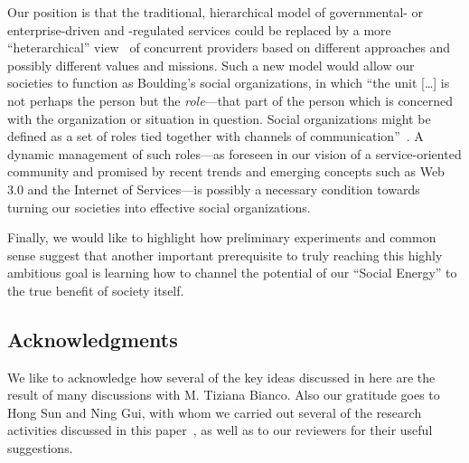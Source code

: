 \documentclass{llncs}
\begin{document}
Our position
is that the traditional, hierarchical
model of governmental- or enterprise-driven and -regulated services could be replaced by
a more ``heterarchical'' view~\cite{Stark,Roc01} of concurrent providers based on different approaches
and possibly different values and missions. Such a new model
would allow our societies to function as
Boulding's social organizations, in which ``the unit [\ldots] is not perhaps the person but the
\emph{role}---that part of the person which is concerned with the organization or situation in question.
Social organizations might be defined as a set of roles tied together with channels 
of communication''~\cite{Bou56}.
A dynamic management of such roles---as foreseen in our vision of a
service-oriented community and promised by recent trends and emerging concepts
such as Web 3.0 and the Internet of Services---is possibly a necessary condition towards turning our
societies into effective social organizations.

Finally, we would like to highlight how preliminary experiments and common sense
suggest that another important prerequisite to
truly reaching this highly ambitious goal is learning how
to channel the potential of our ``Social Energy'' to the true benefit of society itself.


\subsection*{Acknowledgments}
We like to acknowledge how
several of the key ideas discussed in here are the result of
many discussions with M. Tiziana Bianco.
Also our gratitude goes to Hong Sun and Ning Gui, with whom we carried out several of the
research activities discussed in this paper~\cite{SDGB10b,SDGB09a,SDGB07a,SDFB06a,GuD10+,GSDB07},
as well as to our reviewers for their useful suggestions.


\end{document}

